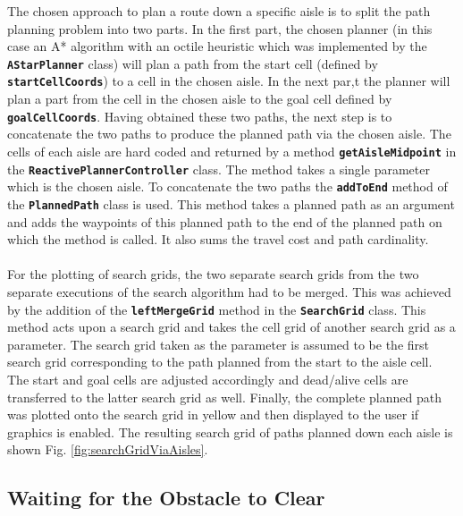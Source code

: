 \documentclass[a4paper,12pt]{article}
\begin{document}
		The chosen approach to plan a route down a specific aisle is to split the path planning problem into two parts. In the first part, the chosen planner (in this case an A* algorithm with an octile heuristic which was implemented by the \textbf{\texttt{AStarPlanner}} class) will plan a path from the start cell (defined by \textbf{\texttt{startCellCoords}}) to a cell in the chosen aisle. In the next par,t the planner will plan a part from the cell in the chosen aisle to the goal cell defined by \textbf{\texttt{goalCellCoords}}. Having obtained these two paths, the next step is to concatenate the two paths to produce the planned path via the chosen aisle. The cells of each aisle are hard coded and returned by a method \textbf{\texttt{getAisleMidpoint}} in the \textbf{\texttt{ReactivePlannerController}} class. The method takes a single parameter which is the chosen aisle. To concatenate the two paths the \textbf{\texttt{addToEnd}} method of the \textbf{\texttt{PlannedPath}} class is used. This method takes a planned path as an argument and adds the waypoints of this planned path to the end of the planned path on which the method is called. It also sums the travel cost and path cardinality.
		\\
		\\
		For the plotting of search grids, the two separate search grids from the two separate executions of the search algorithm had to be merged. This was achieved by the addition of the \textbf{\texttt{leftMergeGrid}} method in the \textbf{\texttt{SearchGrid}} class. This method acts upon a search grid and takes the cell grid of another search grid as a parameter. The search grid taken as the parameter is assumed to be the first search grid corresponding to the path planned from the start to the aisle cell. The start and goal cells are adjusted accordingly and dead/alive cells are transferred to the latter search grid as well. Finally, the complete planned path was plotted onto the search grid in yellow and then displayed to the user if graphics is enabled. The resulting search grid of paths planned down each aisle is shown Fig. \ref{fig:searchGridViaAisles}. 
	
	\subsection{Waiting for the Obstacle to Clear}
	\label{sec:waitingForTheObstacleToClearROS}
	
\end{document}
